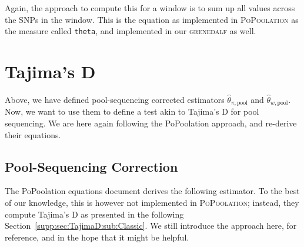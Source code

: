 \documentclass[a4paper,fontsize=9pt,DIV=14]{scrartcl}
\newcommand\toolname{\textsc}
\newcommand\secref[1]{Section~\ref{#1}}
\begin{document}
Again, the approach to compute this for a window is to sum up all values across the SNPs in the window.
This is the equation as implemented in \toolname{PoPoolation} as the measure called \texttt{theta},
and implemented in our \toolname{grenedalf} as well.






\section{Tajima's D}
\label{supp:sec:TajimaD}

Above, we have defined pool-sequencing corrected estimators $\widehat{\theta}_{\pi,\text{pool}}$ and $ \widehat{\theta}_{w, \text{pool}}$.
Now, we want to use them to define a test akin to Tajima's D for pool sequencing.
We are here again following the PoPoolation approach, and re-derive their equations.


\subsection{Pool-Sequencing Correction}
\label{supp:sec:TajimaD:sub:PoolSequencingCorrection}

The PoPoolation equations document derives the following estimator.
To the best of our knowledge, this is however not implemented in \toolname{PoPoolation};
instead, they compute Tajima's D as presented in the following \secref{supp:sec:TajimaD:sub:Classic}.
We still introduce the approach here, for reference, and in the hope that it might be helpful.
\end{document}
